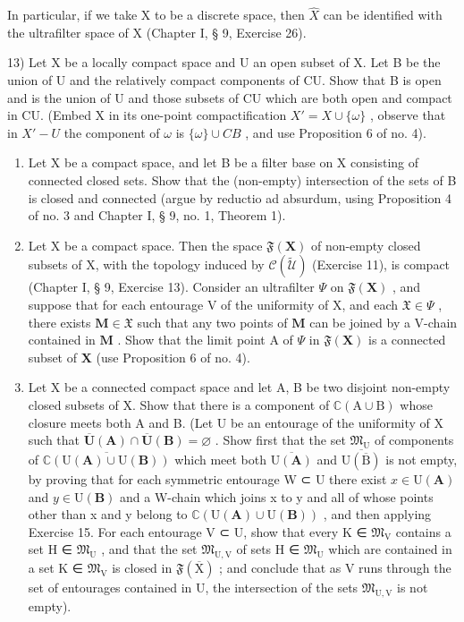 In particular, if we take X to be a discrete space, then \(\hat{X}\) can be identified with the ultrafilter space of X (Chapter I, § 9, Exercise 26).

13) Let X be a locally compact space and U an open subset of X. Let B be the union of U and the relatively compact components of CU. Show that B is open and is the union of U and those subsets of CU which are both open and compact in CU. (Embed X in its one-point compactification \(X' = X \cup \{\omega\}\) , observe that in \(X' - U\) the component of \(\omega\) is \(\{\omega\} \cup CB\) , and use Proposition 6 of no. 4).

\begin{enumerate}
\def\labelenumi{\arabic{enumi})}
\setcounter{enumi}{13}
\item
  Let X be a compact space, and let B be a filter base on X consisting of connected closed sets. Show that the (non-empty) intersection of the sets of B is closed and connected (argue by reductio ad absurdum, using Proposition 4 of no. 3 and Chapter I, § 9, no. 1, Theorem 1).
\item
  Let X be a compact space. Then the space \(\mathfrak{F}(\mathbf{X})\) of non-empty closed subsets of X, with the topology induced by \(\mathcal{C}(\tilde{\mathcal{U}})\) (Exercise 11), is compact (Chapter I, § 9, Exercise 13). Consider an ultrafilter \(\Psi\) on \(\mathfrak{F}(\mathbf{X})\) , and suppose that for each entourage V of the uniformity of X, and each \(\mathfrak{X} \in \Psi\) , there exists \(\mathbf{M} \in \mathfrak{X}\) such that any two points of \(\mathbf{M}\) can be joined by a V-chain contained in \(\mathbf{M}\) . Show that the limit point A of \(\Psi\) in \(\mathfrak{F}(\mathbf{X})\) is a connected subset of \(\mathbf{X}\) (use Proposition 6 of no. 4).
\item
  Let X be a connected compact space and let A, B be two disjoint non-empty closed subsets of X. Show that there is a component of \(\mathbb{C}(\mathrm{A} \cup \mathrm{B})\) whose closure meets both A and B. (Let U be an entourage of the uniformity of X such that \(\overline{\mathbf{U}}(\mathbf{A}) \cap \overline{\mathbf{U}}(\mathbf{B}) = \varnothing\) . Show first that the set \(\mathfrak{M}_{\mathrm{U}}\) of components of \(\overline{\mathbb{C}(\mathrm{U}(\mathbf{A}) \cup \mathrm{U}(\mathbf{B}))}\) which meet both \(\overline{\mathrm{U}(\mathbf{A})}\) and \(\overline{\mathrm{U}(\overline{\mathrm{B}})}\) is not empty, by proving that for each symmetric entourage W ⊂ U there exist \(x \in \mathrm{U}(\mathbf{A})\) and \(y \in \mathrm{U}(\mathbf{B})\) and a W-chain which joins x to y and all of whose points other than x and y belong to \(\mathbb{C}(\mathrm{U}(\mathbf{A}) \cup \mathrm{U}(\mathbf{B}))\) , and then applying Exercise 15. For each entourage V ⊂ U, show that every K ∈ \(\mathfrak{M}_{\mathrm{V}}\) contains a set H ∈ \(\mathfrak{M}_{\mathrm{U}}\) , and that the set \(\mathfrak{M}_{\mathrm{U},\mathrm{V}}\) of sets H ∈ \(\mathfrak{M}_{\mathrm{U}}\) which are contained in a set K ∈ \(\mathfrak{M}_{\mathrm{V}}\) is closed in \(\mathfrak{F}(\overline{\mathrm{X}})\) ; and conclude that as V runs through the set of entourages contained in U, the intersection of the sets \(\mathfrak{M}_{\mathrm{U},\mathrm{V}}\) is not empty).

\end{enumerate}
